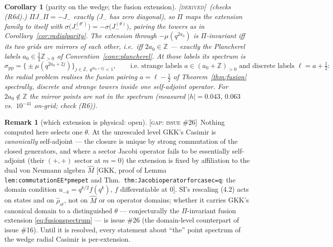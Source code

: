 \documentclass[11pt,a4paper]{article}
\newcommand{\DERIVED}{{\color{teal}\textsc{[derived]}}}
\newcommand{\GAP}[1]{{\color{red}\textsc{[gap: issue \##1]}}}
\theoremstyle{definition}
\newtheorem{remark}[definition]{Remark}
\theoremstyle{plain}
\newtheorem{corollary}[definition]{Corollary}
\newcommand{\Z}{\mathbb{Z}}
\begin{document}
\begin{corollary}[parity on the wedge; the fusion extension]\label{cor:wedgeparityfusion}
\DERIVED\ (checks (R6d).) $\Pi J_{-}\Pi=-J_{-}$ exactly ($J_{-}$ has zero diagonal), so
$\Pi$ maps the extension family to itself with
$\sigma\bigl(J^{(\theta')}_{-}\bigr)=-\sigma\bigl(J^{(\theta)}_{-}\bigr)$, pairing the
towers as in Corollary~\ref{cor:radialparity}. The extension through $-\mu(q^{2a_{0}})$ is
$\Pi$-invariant iff its two grids are mirrors of each other, i.e.\ iff
$2a_{0}\in\Z$ --- \emph{exactly the Plancherel labels} $a_{0}\in\tfrac12\Z_{>0}$ of
Convention~\ref{conv:plancherel}. At those labels its spectrum is
\begin{equation}\label{eq:fusionspectrum}
  \sigma_{\mathrm{pp}}=\bigl\{\pm\mu(q^{2a_{0}+2j})\bigr\}_{j\in\Z,\;q^{2a_{0}+2j}<1},\qquad
  \text{i.e.\ strange labels } a\in(a_{0}+\Z)_{>0}\text{ and discrete labels }
  \ell=a+\tfrac12 :
\end{equation}
the radial problem realises the fusion pairing $a=\ell-\tfrac12$ of
Theorem~\ref{thm:fusion} spectrally, discrete and strange towers inside one self-adjoint
operator. For $2a_{0}\notin\Z$ the mirror points are \emph{not} in the spectrum (measured
$|h|=0.043$, $0.063$ vs.\ $10^{-41}$ on-grid; check (R6)).
\end{corollary}

\begin{remark}[which extension is physical: open]\label{rem:whichextension}
\GAP{26}\ Nothing computed here selects one $\theta$. At the unrescaled level GKK's Casimir
is \emph{canonically} self-adjoint --- the closure is unique by strong commutation of the
closed generators, and where a sector Jacobi operator fails to be essentially self-adjoint
(their $(+,+)$ sector at $m=0$) the extension is fixed by affiliation to the dual von
Neumann algebra $\hat M$ [GKK, proof of Lemma \texttt{lem:commutationEE*pmepet} and Thm.\
\texttt{thm:Jacobioperatorforcasec=q}: the domain condition
$u_{-k}=q^{k/2}f(q^{k})$, $f$ differentiable at $0$]. SI's rescaling (4.2) acts on states
and on $\hat\rho_{st}$, not on $\hat M$ or on operator domains; whether it carries GKK's
canonical domain to a distinguished $\theta$ --- conjecturally the $\Pi$-invariant fusion
extension \eqref{eq:fusionspectrum} --- is issue \#26 (the domain-level counterpart of
issue \#16). Until it is resolved, every statement about ``the'' point spectrum of the
wedge radial Casimir is per-extension.
\end{remark}
\end{document}
